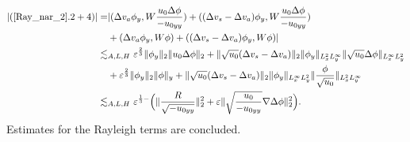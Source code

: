 \documentclass[reqno, 11pt]{amsart}
\theoremstyle{plain}
\theoremstyle{definition}
\theoremstyle{remark}
\numberwithin{equation}{section}
\begin{document}
\begin{equation}\label{Ray_nar_2-3}
\begin{aligned}
|(\ref{Ray_nar_2}.2 + 4)| =& |(\Delta v_a \phi_y, W \frac{u_0 \Delta \phi}{-u_{0yy}} ) + ((\Delta v_s - \Delta v_a) \phi_y, W \frac{u_0 \Delta \phi}{-u_{0yy}} )\\
&+ (\Delta v_a \phi_y, W \phi) + ((\Delta v_s - \Delta v_a) \phi_y, W \phi)|\\
\lesssim&_{A,L,H}~ \varepsilon^{\frac{2}{3}} \|\phi_y\|_2 \|u_0 \Delta \phi\|_2 + \|\sqrt{u_0} (\Delta v_s - \Delta v_a)\|_{2} \| \phi_y\|_{L^2_x L^\infty_y} \| \sqrt{u_0} \Delta \phi\|_{L^\infty_x L^2_y}\\
&+ \varepsilon^{\frac{2}{3}} \| \phi_y \|_2 \| \phi \|_y + \|\sqrt{u_0} (\Delta v_s - \Delta v_a)\|_{2} \| \phi_y\|_{L^\infty_x L^2_y} \| \frac{\phi}{\sqrt{u_0}} \|_{L^2_x L^\infty_y} \\
\lesssim&_{A,L,H}~ \varepsilon^{\frac{1}{3}-} \Big( \|\frac{R}{\sqrt{-u_{0yy}}}\|_2^2 + \varepsilon \| \sqrt{\frac{u_0}{-u_{0yy}}} \nabla\Delta \phi\|_2^2\Big).
\end{aligned}
\end{equation}
Estimates for the Rayleigh terms are concluded.
\end{document}
